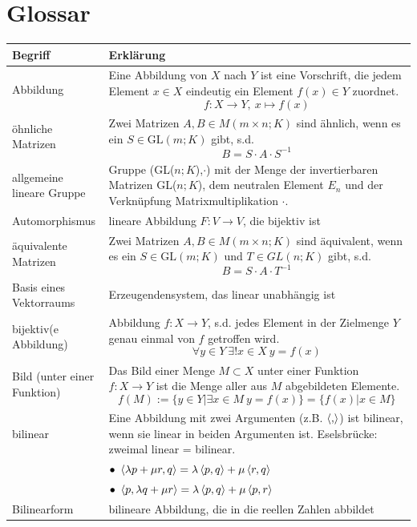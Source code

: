 \documentclass{article}
\begin{document}
\newpage


\section{Glossar}
\begin{xltabular}{\linewidth}{p{0.33\textwidth}|X}
	\hline\hline
		Begriff & Erklärung \\
	\hline
		Abbildung & Eine Abbildung von $X$ nach $Y$ ist eine Vorschrift, die jedem Element $x\in X$ eindeutig ein Element $f(x)\in Y$ zuordnet.
			$$f:X\rightarrow Y,\ x\mapsto f(x)$$ \\
	\hline
		öhnliche Matrizen & Zwei Matrizen $A,B\in M(m\times n; K)$ sind ähnlich, wenn es ein $S\in \text{GL}(m; K)$ gibt, s.d.
			$$B = S\cdot A\cdot S^{-1}$$ \\
	\hline
		allgemeine lineare Gruppe & Gruppe (GL($n;K$),$\cdot$) mit der Menge der invertierbaren Matrizen GL($n;K$), dem neutralen Element $E_n$ und der Verknüpfung Matrixmultiplikation $\cdot$. \\
	\hline
		Automorphismus & lineare Abbildung $F:V\rightarrow V$, die bijektiv ist \\
	\hline
		äquivalente Matrizen & Zwei Matrizen $A,B\in M(m\times n; K)$ sind äquivalent, wenn es ein $S\in \text{GL}(m; K)$ und $T\in GL(n; K)$ gibt, s.d.
			$$B = S\cdot A\cdot T^{-1}$$ \\
	\hline
		Basis eines Vektorraums & Erzeugendensystem, das linear unabhängig ist \\
	\hline
		bijektiv(e Abbildung) & Abbildung $f:X\rightarrow Y$, s.d. jedes Element in der Zielmenge $Y$ genau einmal von $f$ getroffen wird.
			$$\forall y\in Y\ \exists! x\in X\ y=f(x)$$ \\
	\hline
		Bild (unter einer Funktion) & Das Bild einer Menge $M\subset X$ unter einer Funktion $f:X\rightarrow Y$ ist die Menge aller aus $M$ abgebildeten Elemente.
			$$f(M) := \{y\in Y | \exists x\in M\ y=f(x)\} = \{f(x) | x\in M\}$$ \\
	\hline
		bilinear & Eine Abbildung mit zwei Argumenten \textcolor{gruen}{(z.B. $\braket{,}$)} ist bilinear, wenn sie linear in beiden Argumenten ist. \textcolor{gruen}{Eselsbrücke: zweimal linear = bilinear.}\\
		& $\bullet\ \braket{\lambda p + \mu r, q} = \lambda\braket{p,q} + \mu\braket{r,q}$\\
		& $\bullet\ \braket{p, \lambda q + \mu r} = \lambda\braket{p,q} + \mu\braket{p,r}$\\
	\hline
		Bilinearform & bilineare Abbildung, die in die reellen Zahlen abbildet \\

\end{xltabular}
\end{document}

